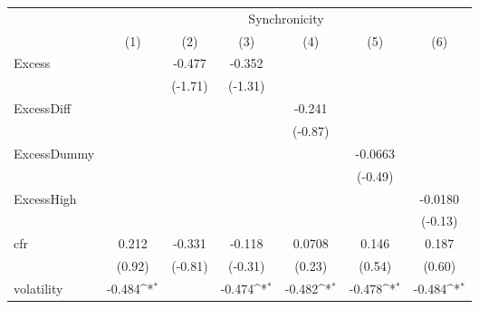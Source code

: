 {
\def\sym#1{\ifmmode^{#1}\else\(^{#1}\)\fi}
\begin{tabular}{l*{6}{c}}
\hline\hline
            &\multicolumn{6}{c}{Synchronicity}                                                                                                  \\\cmidrule(lr){2-7}
            &\multicolumn{1}{c}{(1)}         &\multicolumn{1}{c}{(2)}         &\multicolumn{1}{c}{(3)}         &\multicolumn{1}{c}{(4)}         &\multicolumn{1}{c}{(5)}         &\multicolumn{1}{c}{(6)}         \\
\hline
Excess      &                     &      -0.477         &      -0.352         &                     &                     &                     \\
            &                     &     (-1.71)         &     (-1.31)         &                     &                     &                     \\
[1em]
ExcessDiff  &                     &                     &                     &      -0.241         &                     &                     \\
            &                     &                     &                     &     (-0.87)         &                     &                     \\
[1em]
ExcessDummy &                     &                     &                     &                     &     -0.0663         &                     \\
            &                     &                     &                     &                     &     (-0.49)         &                     \\
[1em]
ExcessHigh  &                     &                     &                     &                     &                     &     -0.0180         \\
            &                     &                     &                     &                     &                     &     (-0.13)         \\
[1em]
cfr         &       0.212         &      -0.331         &      -0.118         &      0.0708         &       0.146         &       0.187         \\
            &      (0.92)         &     (-0.81)         &     (-0.31)         &      (0.23)         &      (0.54)         &      (0.60)         \\
[1em]
volatility  &      -0.484\sym{*}  &                     &      -0.474\sym{*}  &      -0.482\sym{*}  &      -0.478\sym{*}  &      -0.484\sym{*}  \\

\end{tabular}}
